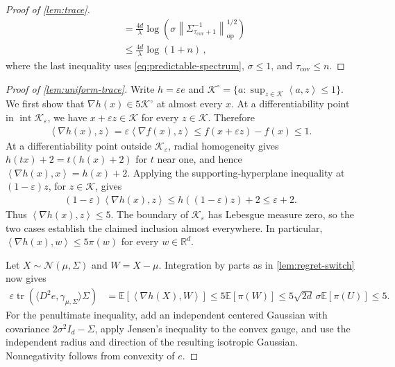 \documentclass[11pt]{article}
\newcommand{\R}{\mathbb R}
\newcommand{\E}{\mathbb E}
\newcommand{\K}{\mathcal K}
\newcommand{\N}{\mathcal N}
\newcommand{\tr}{\operatorname{tr}}
\newcommand{\op}{\mathrm{op}}
\newcommand{\1}{\mathbf 1}
\newcommand{\eps}{\varepsilon}
\newcommand{\ip}[2]{\left\langle #1,#2\right\rangle}
\newcommand{\norm}[1]{\left\lVert #1\right\rVert}
\begin{document}
\begin{proof}[Proof of \cref{lem:trace}]
\begin{align}
         & =
        \frac{4d}{\lambda}
        \log\left(
        \sigma
        \norm{\Sigma_{\tau_{\mathrm{cov}}+1}^{-1}}_{\op}^{1/2}
        \right)               \\
         & \leq
        \frac{4d}{\lambda}
        \log\left(1+n\right)\,,
    \end{align}
    where the last inequality
    uses \eqref{eq:predictable-spectrum},
    $\sigma\leq1$, and $\tau_{\mathrm{cov}}\leq n$.
\end{proof}


\begin{proof}[Proof of \cref{lem:uniform-trace}]
    Write $h=\eps e$ and
    $\K^\circ=\{a:\sup_{z\in\K}\ip{a}{z}\leq1\}$.
    We first show that $\nabla h(x)\in5\K^\circ$ at almost every $x$.
    At a differentiability point in $\operatorname{int}\K_\eps$, we have
    $x+\eps z\in\K$ for every $z\in\K$. Therefore
    \begin{align}
        \ip{\nabla h(x)}{z}
        =\eps\ip{\nabla f(x)}{z}
        \leq f(x+\eps z)-f(x)\leq1.
    \end{align}
    At a differentiability point outside $\K_\eps$, radial homogeneity
    gives $h(tx)+2=t(h(x)+2)$ for $t$ near one, and hence
    $\ip{\nabla h(x)}{x}=h(x)+2$. Applying the supporting-hyperplane
    inequality at $(1-\eps)z$, for $z\in\K$, gives
    \begin{align}
        (1-\eps)\ip{\nabla h(x)}{z}
        \leq h((1-\eps)z)+2\leq\eps+2.
    \end{align}
    Thus $\ip{\nabla h(x)}{z}\leq5$. The boundary of $\K_\eps$ has
    Lebesgue measure zero, so the two cases establish the claimed
    inclusion almost everywhere. In particular,
    $\ip{\nabla h(x)}{w}\leq5\pi(w)$ for every $w\in\R^d$.

    Let $X\sim\N(\mu,\Sigma)$ and $W=X-\mu$. Integration by parts as
    in \cref{lem:regret-switch} now gives
    \begin{align}
        \eps\tr\left(\langle D^2e,\gamma_{\mu,\Sigma}\rangle\Sigma\right)
         & =\E\left[\ip{\nabla h(X)}{W}\right]
        \leq5\E[\pi(W)]
        \leq5\sqrt{2d}\,\sigma\E[\pi(U)]
        \leq5.
    \end{align}
    For the penultimate inequality, add an independent centered Gaussian
    with covariance $2\sigma^2I_d-\Sigma$, apply Jensen's inequality to
    the convex gauge, and use the independent radius and direction of
    the resulting isotropic Gaussian. Nonnegativity follows from
    convexity of $e$.
\end{proof}
\end{document}
